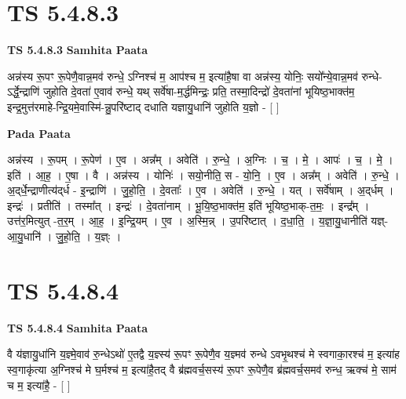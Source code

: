 \documentclass[17pt]{extarticle}
\begin{document}
\section*{ TS 5.4.8.3 }

\textbf{TS 5.4.8.3 } \newline
\textbf{Samhita Paata} \newline

अन्न॑स्य रू॒पꣳ रू॒पेणै॒वान्न॒मव॑ रुन्धे॒ ऽग्निश्च॑ म॒ आप॑श्च म॒ इत्या॑है॒षा वा अन्न॑स्य॒ योनिः॒ सयो᳚न्ये॒वान्न॒मव॑ रुन्धे-ऽर्द्धे॒न्द्राणि॑ जुहोति दे॒वता॑ ए॒वाव॑ रुन्धे॒ यथ् सर्वे॑षा-म॒र्द्धमिन्द्रः॒ प्रति॒ तस्मा॒दिन्द्रो॑ दे॒वता॑नां भूयिष्ठ॒भाक्त॑म॒ इन्द्र॒मुत्त॑रमाहे-न्द्रि॒यमे॒वास्मि॑-न्नु॒परि॑ष्टाद् दधाति यज्ञायु॒धानि॑ जुहोति य॒ज्ञो - [  ] \newline

\textbf{Pada Paata} \newline

अन्न॑स्य । रू॒पम् । रू॒पेण॑ । ए॒व । अन्न᳚म् । अवेति॑ । रु॒न्धे॒ । अ॒ग्निः । च॒ । मे॒ । आपः॑ । च॒ । मे॒ । इति॑ । आ॒ह॒ । ए॒षा । वै । अन्न॑स्य । योनिः॑ । सयो॒नीति॒ स - यो॒नि॒ । ए॒व । अन्न᳚म् । अवेति॑ । रु॒न्धे॒ । अ॒द्‌र्धे॒न्द्राणीत्य॑द्‌र्ध - इ॒न्द्राणि॑ । जु॒हो॒ति॒ । दे॒वताः᳚ । ए॒व । अवेति॑ । रु॒न्धे॒ । यत् । सर्वे॑षाम् । अ॒द्‌र्धम् । इन्द्रः॑ । प्रतीति॑ । तस्मा᳚त् । इन्द्रः॑ । दे॒वता॑नाम् । भू॒यि॒ष्ठ॒भाक्त॑म॒ इति॑ भूयिष्ठ॒भाक्-त॒मः॒ । इन्द्र᳚म् । उत्त॑र॒मित्युत् -त॒र॒म् । आ॒ह॒ । इ॒न्द्रि॒यम् । ए॒व । अ॒स्मि॒न्न् । उ॒परि॑ष्टात् । द॒धा॒ति॒ । य॒ज्ञा॒यु॒धानीति॑ यज्ञ्-आ॒यु॒धानि॑ । जु॒हो॒ति॒ । य॒ज्ञ्ः ।  \newline




\section*{ TS 5.4.8.4 }

\textbf{TS 5.4.8.4 } \newline
\textbf{Samhita Paata} \newline

वै य॑ज्ञायु॒धा॑नि य॒ज्ञ्मे॒वाव॑ रु॒न्धेऽथो॑ ए॒तद्वै य॒ज्ञ्स्य॑ रू॒पꣳ रू॒पेणै॒व य॒ज्ञ्मव॑ रुन्धे ऽवभृ॒थश्च॑ मे स्वगाका॒रश्च॑ म॒ इत्या॑ह स्व॒गाकृ॑त्या अ॒ग्निश्च॑ मे घ॒र्मश्च॑ म॒ इत्या॑है॒तद् वै ब्र॑ह्मवर्च॒सस्य॑ रू॒पꣳ रू॒पेणै॒व ब्र॑ह्मवर्च॒समव॑ रुन्ध॒ ऋक्च॑ मे॒ साम॑ च म॒ इत्या॑है॒ - [  ] \newline
\end{document}
